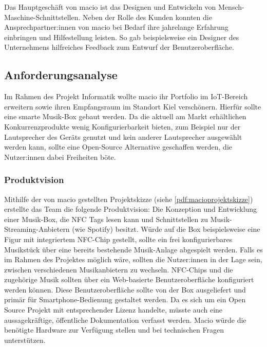 \documentclass[10pt, a4paper]{article}
\begin{document}
\begin{onehalfspace}
Das Hauptgeschäft von macio ist das Designen und Entwickeln von Mensch-Maschine-Schnittstellen.
Neben der Rolle des Kunden konnten die Ansprechpartner:innen von macio bei Bedarf ihre jahrelange Erfahrung einbringen und Hilfestellung leisten.
So gab beispielsweise ein Designer des Unternehmens hilfreiches Feedback zum Entwurf der Benutzeroberfläche.
\subsection{Anforderungsanalyse}
Im Rahmen des Projekt Informatik wollte macio ihr Portfolio im IoT-Bereich erweitern sowie ihren Empfangsraum im Standort Kiel verschönern.
Hierfür sollte eine smarte Musik-Box gebaut werden.
Da die aktuell am Markt erhältlichen Konkurrenzprodukte wenig Konfigurierbarkeit bieten, zum Beispiel nur der Lautsprecher des Geräts genutzt und kein anderer Lautsprecher ausgewählt werden kann, sollte eine Open-Source Alternative geschaffen werden, die Nutzer:innen dabei Freiheiten böte.
\subsubsection{Produktvision}
Mithilfe der von macio gestellten Projektskizze (siehe \autoref{pdf:macioprojektskizze}) erstellte das Team die folgende Produktvision:
Die Konzeption und Entwicklung einer Musik-Box, die NFC Tags lesen kann und Schnittstellen zu Musik-Streaming-Anbietern (wie Spotify) besitzt.
Würde auf die Box beispielsweise eine Figur mit integriertem NFC-Chip gestellt, sollte ein frei konfigurierbares Musikstück über eine bereits bestehende Musik-Anlage abgespielt werden.
Falls es im Rahmen des Projektes möglich wäre, sollten die Nutzer:innen in der Lage sein, zwischen verschiedenen Musik\-anbietern zu wechseln.
NFC-Chips und die zugehörige Musik sollten über ein Web-basierte Benutzeroberfläche konfiguriert werden können.
Diese Benutzeroberfläche sollte von der Box ausgeliefert und primär für Smartphone-Bedienung gestaltet werden.
Da es sich um ein Open Source Projekt mit entsprechender Lizenz handelte, müsste auch eine aussagekräftige, öffentliche Dokumentation verfasst werden.
Macio würde die benötigte Hardware zur Verfügung stellen und bei technischen Fragen unterstützen.\\


\end{onehalfspace}
\end{document}
